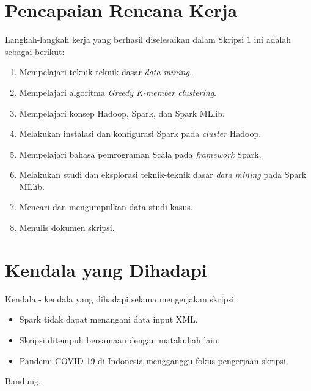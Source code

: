 \documentclass[a4paper,twoside]{article}
\begin{document}
\section{Pencapaian Rencana Kerja}
Langkah-langkah kerja yang berhasil diselesaikan dalam Skripsi 1 ini adalah sebagai berikut:
\begin{enumerate}
\item Mempelajari teknik-teknik dasar {\it data mining}.
\item Mempelajari algoritma {\it Greedy K-member clustering}.
\item Mempelajari konsep Hadoop, Spark, dan Spark MLlib. 
\item Melakukan instalasi dan konfigurasi Spark pada {\it cluster} Hadoop.
\item Mempelajari bahasa pemrograman Scala pada {\it framework} Spark.
\item Melakukan studi dan eksplorasi teknik-teknik dasar {\it data mining} pada Spark MLlib.
\item Mencari dan mengumpulkan data studi kasus.
\item Menulis dokumen skripsi.
\end{enumerate}



\section{Kendala yang Dihadapi}
Kendala - kendala yang dihadapi selama mengerjakan skripsi :
\begin{itemize}
	\item Spark tidak dapat menangani data input XML.
	\item Skripsi ditempuh bersamaan dengan matakuliah lain.
	\item Pandemi COVID-19 di Indonesia mengganggu fokus pengerjaan skripsi.
\end{itemize}

\vspace{1cm}
\centering Bandung, \tanggal\\
\vspace{2cm} \nama \\ 
\vspace{1cm}
\end{document}
